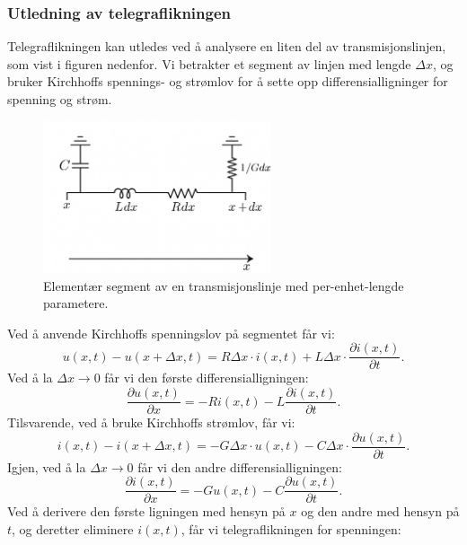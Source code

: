 \subsubsection{Utledning av telegraflikningen}
Telegraflikningen kan utledes ved å analysere en liten del av transmisjonslinjen, som vist i figuren nedenfor. Vi betrakter et segment av linjen med lengde $\Delta x$, og bruker Kirchhoffs spennings- og strømlov for å sette opp differensialligninger for spenning og strøm.
\begin{figure}[h]
    \centering
    \includegraphics[width=0.6\textwidth]{Media/telegraflinje.png}
    \caption{Elementær segment av en transmisjonslinje med per-enhet-lengde parametere.}
    \label{fig:transmission_line_segment}   
\end{figure}
Ved å anvende Kirchhoffs spenningslov på segmentet får vi:
\begin{equation}
    u(x,t) - u(x+\Delta x,t) = R \Delta x \cdot i(x,t) + L \Delta x \cdot \frac{\partial i(x,t)}{\partial t} .
\end{equation}
Ved å la $\Delta x \to 0$ får vi den første differensialligningen:
\begin{equation}
    \frac{\partial u(x,t)}{\partial x} = -R i(x,t) - L \frac{\partial i(x,t)}{\partial t} . 
\end{equation}
Tilsvarende, ved å bruke Kirchhoffs strømlov, får vi:
\begin{equation}
    i(x,t) - i(x+\Delta x,t) = -G \Delta x \cdot u(x,t) - C \Delta x \cdot \frac{\partial u(x,t)}{\partial t} .
\end{equation}
Igjen, ved å la $\Delta x \to 0$ får vi den andre differensialligningen:
\begin{equation}
    \frac{\partial i(x,t)}{\partial x} = -G u(x,t) - C \frac{\partial u(x,t)}{\partial t} .
\end{equation}
Ved å derivere den første ligningen med hensyn på $x$ og den andre med hensyn på $t$, og deretter eliminere $i(x,t)$, får vi telegraflikningen for spenningen:

